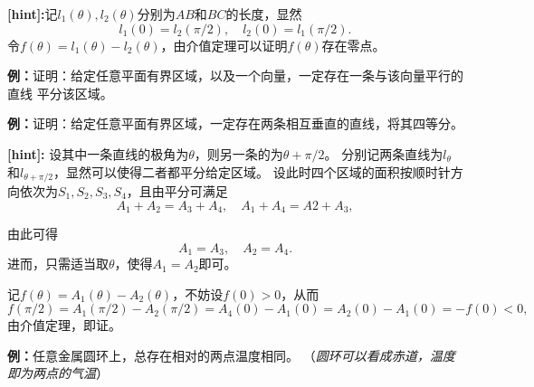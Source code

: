 {\bf [hint]:}记$l_1(\theta),l_2(\theta)$分别为$AB$和$BC$的长度，显然
$$l_1(0)=l_2(\pi/2),\quad l_2(0)=l_1(\pi/2).$$
令$f(\theta)=l_1(\theta)-l_2(\theta)$，由介值定理可以证明$f(\theta)$存在零点。

{\bf 例：}证明：给定任意平面有界区域，以及一个向量，一定存在一条与该向量平行的直线
平分该区域。

{\bf 例：}证明：给定任意平面有界区域，一定存在两条相互垂直的直线，将其四等分。

{\bf [hint]:} 设其中一条直线的极角为$\theta$，则另一条的为$\theta+\pi/2$。
分别记两条直线为$l_{\theta}$和$l_{\theta+\pi/2}$，显然可以使得二者都平分给定区域。
设此时四个区域的面积按顺时针方向依次为$S_1,S_2,S_3,S_4$，且由平分可满足
$$A_1+A_2=A_3+A_4,\quad A_1+A_4=A2+A_3,$$

\begin{center}
\end{center}

由此可得
$$A_1=A_3,\quad A_2=A_4.$$
进而，只需适当取$\theta$，使得$A_1=A_2$即可。

记$f(\theta)=A_1(\theta)-A_2(\theta)$，不妨设$f(0)>0$，从而
$$f(\pi/2)=A_1(\pi/2)-A_2(\pi/2)=A_4(0)-A_1(0)=A_2(0)-A_1(0)=-f(0)<0,$$
由介值定理，即证。

{\bf 例：}任意金属圆环上，总存在相对的两点温度相同。
（{\it 圆环可以看成赤道，温度即为两点的气温}）

\newpage

